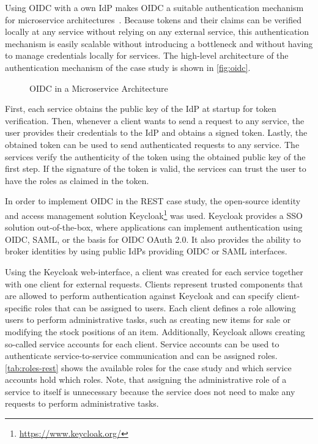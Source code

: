 Using \ac{OIDC} with a own \ac{IdP} makes \ac{OIDC} a suitable authentication mechanism for microservice architectures~\cite{Nehme2019}.
Because tokens and their claims can be verified locally at any service without relying on any external service, this authentication mechanism is easily scalable without introducing a bottleneck and without having to manage credentials locally for services.
The high-level architecture of the authentication mechanism of the case study is shown in \autoref{fig:oidc}.

\begin{figure}[!htb]
    \centering
    
    \caption{\ac{OIDC} in a Microservice Architecture}\label{fig:oidc}
\end{figure}

First, each service obtains the public key of the \ac{IdP} at startup for token verification.
Then, whenever a client wants to send a request to any service, the user provides their credentials to the \ac{IdP} and obtains a signed token.
Lastly, the obtained token can be used to send authenticated requests to any service.
The services verify the authenticity of the token using the obtained public key of the first step.
If the signature of the token is valid, the services can trust the user to have the roles as claimed in the token.

In order to implement \ac{OIDC} in the \ac{REST} case study, the open-source identity and access management solution Keycloak\footnote{\url{https://www.keycloak.org/}} was used.
Keycloak provides a \ac{SSO} solution out-of-the-box, where applications can implement authentication using \ac{OIDC}, \ac{SAML}, or the basis for \ac{OIDC} OAuth 2.0.
It also provides the ability to broker identities by using public \acp{IdP} providing \ac{OIDC} or \ac{SAML} interfaces.

Using the Keycloak web-interface, a client was created for each service together with one client for external requests.
Clients represent trusted components that are allowed to perform authentication against Keycloak and can specify client-specific roles that can be assigned to users.
Each client defines a role allowing users to perform administrative tasks, such as creating new items for sale or modifying the stock positions of an item.
Additionally, Keycloak allows creating so-called service accounts for each client.
Service accounts can be used to authenticate service-to-service communication and can be assigned roles.
\autoref{tab:roles-rest} shows the available roles for the case study and which service accounts hold which roles.
Note, that assigning the administrative role of a service to itself is unnecessary because the service does not need to make any requests to perform administrative tasks.

